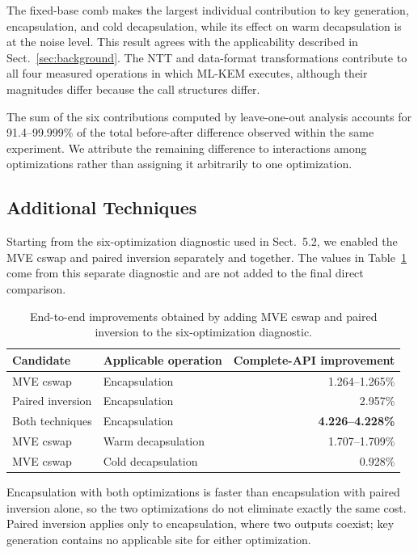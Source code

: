 \documentclass[runningheads,orivec]{llncs}
\begin{document}
The fixed-base comb makes the largest individual contribution to key
generation, encapsulation, and cold decapsulation, while its effect on warm
decapsulation is at the noise level. This result agrees with the applicability
described in Sect.~\ref{sec:background}. The NTT and data-format transformations
contribute to all four measured operations in which ML-KEM executes, although
their magnitudes differ because the call structures differ.

The sum of the six contributions computed by leave-one-out analysis accounts
for 91.4--99.999\% of the total before-after difference observed within the same
experiment. We attribute the remaining difference to interactions among
optimizations rather than assigning it arbitrarily to one optimization.

\FloatBarrier
\subsection{Additional Techniques}

Starting from the six-optimization diagnostic used in Sect.~5.2, we enabled the
MVE cswap and paired inversion separately and together. The values in
Table~\ref{tab:additional-techniques} come from this separate diagnostic and are
not added to the final direct comparison.
\begin{table}[t]
\centering
\caption{End-to-end improvements obtained by adding MVE cswap and paired
inversion to the six-optimization diagnostic.}
\label{tab:additional-techniques}
\footnotesize
\begin{tabular}{@{}llr@{}}
\toprule
Candidate & Applicable operation & Complete-API improvement \\
\midrule
MVE cswap & Encapsulation & 1.264--1.265\% \\
Paired inversion & Encapsulation & 2.957\% \\
Both techniques & Encapsulation & \textbf{4.226--4.228\%} \\
MVE cswap & Warm decapsulation & 1.707--1.709\% \\
MVE cswap & Cold decapsulation & 0.928\% \\
\bottomrule
\end{tabular}
\end{table}

Encapsulation with both optimizations is faster than encapsulation with paired
inversion alone, so the two optimizations do not eliminate exactly the same
cost. Paired inversion applies only to encapsulation, where two outputs coexist;
key generation contains no applicable site for either optimization.
\end{document}
